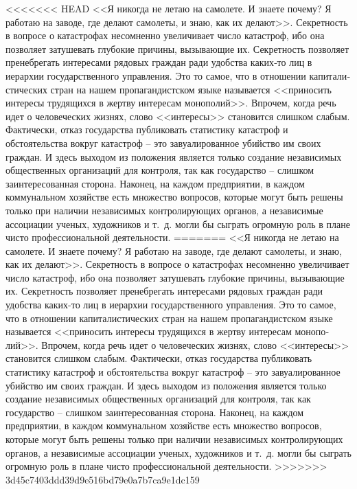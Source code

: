 \documentclass{book}
\begin{document}
<<<<<<< HEAD
<<Я никогда не летаю на самолете. И знаете почему? Я работаю на заводе, где делают самолеты, и знаю, как их делают>>. Секрет­ность в вопросе о катастрофах несомненно увеличивает число ка­тастроф, ибо она позволяет затушевать глубокие причины, вызы­вающие их. Секретность позволяет пренебрегать интересами ря­довых граждан ради удобства каких‑то лиц в иерархии государ­ственного управления. Это то самое, что в отношении капитали­стических стран на нашем пропагандистском языке называется <<приносить интересы трудящихся в жертву интересам монопо­лий>>. Впрочем, когда речь идет о человеческих жизнях, слово <<интересы>> становится слишком слабым. Фактически, отказ го­сударства публиковать статистику катастроф и обстоятельства вокруг катастроф -- это завуалированное убийство им своих граждан. И здесь выходом из положения является только созда­ние независимых общественных организаций для контроля, так как государство -- слишком заинтересованная сторона. Наконец, на каждом предприятии, в каждом коммунальном хозяйстве есть множество вопросов, которые могут быть решены только при наличии независимых контролирующих органов, а независи­мые ассоциации ученых, художников и т.~д. могли бы сыграть огромную роль в плане чисто профессиональной деятельности.
=======
<<Я никогда не летаю на самолете. И знаете почему? Я работаю на заводе, где делают самолеты, и знаю, как их делают>>. Секрет­ность в вопросе о катастрофах несомненно увеличивает число ка­тастроф, ибо она позволяет затушевать глубокие причины, вызы­вающие их. Секретность позволяет пренебрегать интересами ря­довых граждан ради удобства каких-то лиц в иерархии государ­ственного управления. Это то самое, что в отношении капитали­стических стран на нашем пропагандистском языке называется <<приносить интересы трудящихся в жертву интересам монопо­лий>>. Впрочем, когда речь идет о человеческих жизнях, слово <<интересы>> становится слишком слабым. Фактически, отказ го­сударства публиковать статистику катастроф и обстоятельства вокруг катастроф -- это завуалированное убийство им своих граждан. И здесь выходом из положения является только созда­ние независимых общественных организаций для контроля, так как государство -- слишком заинтересованная сторона. Наконец, на каждом предприятии, в каждом коммунальном хозяйстве есть 
множество вопросов, которые могут быть решены только при наличии независимых контролирующих органов, а независи­мые ассоциации ученых, художников и т.~д. могли бы сыграть огромную роль в плане чисто профессиональной деятельности.
>>>>>>> 3d45c7403ddd39d9e516bd79e0a7b7ca9e1dc159
\end{document}

